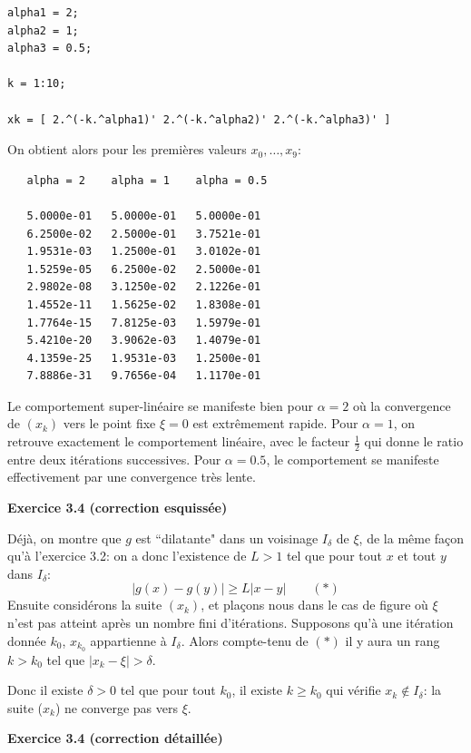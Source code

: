 \documentclass{article}
\begin{document}
\begin{enumerate}
\begin{verbatim}
alpha1 = 2;
alpha2 = 1;
alpha3 = 0.5;

k = 1:10;

xk = [ 2.^(-k.^alpha1)' 2.^(-k.^alpha2)' 2.^(-k.^alpha3)' ]
\end{verbatim}

On obtient alors pour les premières valeurs $x_0,\ldots,x_9$:

\begin{verbatim}
   alpha = 2    alpha = 1    alpha = 0.5

   5.0000e-01   5.0000e-01   5.0000e-01
   6.2500e-02   2.5000e-01   3.7521e-01
   1.9531e-03   1.2500e-01   3.0102e-01
   1.5259e-05   6.2500e-02   2.5000e-01
   2.9802e-08   3.1250e-02   2.1226e-01
   1.4552e-11   1.5625e-02   1.8308e-01
   1.7764e-15   7.8125e-03   1.5979e-01
   5.4210e-20   3.9062e-03   1.4079e-01
   4.1359e-25   1.9531e-03   1.2500e-01
   7.8886e-31   9.7656e-04   1.1170e-01
\end{verbatim}

Le comportement super-linéaire se manifeste bien pour $\alpha=2$ où la convergence de $(x_k)$ vers le point fixe $\xi = 0$ est extr\^emement rapide. Pour $\alpha=1$, on retrouve exactement le comportement linéaire, avec le facteur $\frac12$ qui donne le ratio entre deux itérations successives. Pour $\alpha=0.5$, le comportement se manifeste effectivement par une convergence très lente.

\end{enumerate}

{\bf Exercice 3.4 (correction esquissée)}

Déjà, on montre que $g$ est ``dilatante" dans un voisinage $I_\delta$ de $\xi$, de la même façon qu'à l'exercice 3.2: on a donc l'existence de $L>1$ tel que pour tout $x$ et tout $y$ dans $I_\delta$:
\[
|g(x)-g(y)| \geq L |x-y| \qquad (*)
\]
Ensuite considérons la suite $(x_k)$, et plaçons nous dans le cas de figure où $\xi$ n'est pas atteint après un nombre fini d'itérations. Supposons qu'à une itération donnée $k_0$, $x_{k_0}$ appartienne à $I_\delta$. Alors compte-tenu de $(*)$ il y aura un rang $k > k_0$ tel que $|x_k - \xi | > \delta$.

Donc il existe $\delta > 0$ tel que pour tout $k_0$, il existe $k\geq k_0$ qui vérifie $x_k \notin I_\delta$: la suite ($x_k$) ne converge pas vers $\xi$.

\medskip

{\bf Exercice 3.4 (correction détaillée)}

\smallskip
\end{document}
